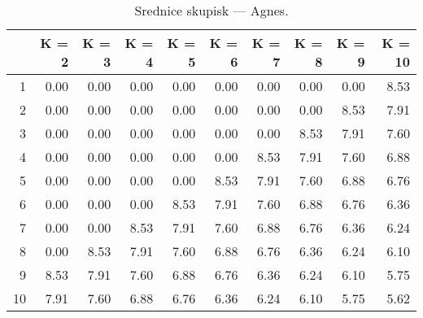 \begin{table}[ht]
\centering
\begin{tabular}{rrrrrrrrrr}
  \hline
 & K = 2 & K = 3 & K = 4 & K = 5 & K = 6 & K = 7 & K = 8 & K = 9 & K = 10 \\ 
  \hline
1 & 0.00 & 0.00 & 0.00 & 0.00 & 0.00 & 0.00 & 0.00 & 0.00 & 8.53 \\ 
  2 & 0.00 & 0.00 & 0.00 & 0.00 & 0.00 & 0.00 & 0.00 & 8.53 & 7.91 \\ 
  3 & 0.00 & 0.00 & 0.00 & 0.00 & 0.00 & 0.00 & 8.53 & 7.91 & 7.60 \\ 
  4 & 0.00 & 0.00 & 0.00 & 0.00 & 0.00 & 8.53 & 7.91 & 7.60 & 6.88 \\ 
  5 & 0.00 & 0.00 & 0.00 & 0.00 & 8.53 & 7.91 & 7.60 & 6.88 & 6.76 \\ 
  6 & 0.00 & 0.00 & 0.00 & 8.53 & 7.91 & 7.60 & 6.88 & 6.76 & 6.36 \\ 
  7 & 0.00 & 0.00 & 8.53 & 7.91 & 7.60 & 6.88 & 6.76 & 6.36 & 6.24 \\ 
  8 & 0.00 & 8.53 & 7.91 & 7.60 & 6.88 & 6.76 & 6.36 & 6.24 & 6.10 \\ 
  9 & 8.53 & 7.91 & 7.60 & 6.88 & 6.76 & 6.36 & 6.24 & 6.10 & 5.75 \\ 
  10 & 7.91 & 7.60 & 6.88 & 6.76 & 6.36 & 6.24 & 6.10 & 5.75 & 5.62 \\ 
   \hline
\end{tabular}
\caption{Srednice skupisk --- Agnes.} 
\label{A2}
\end{table}
